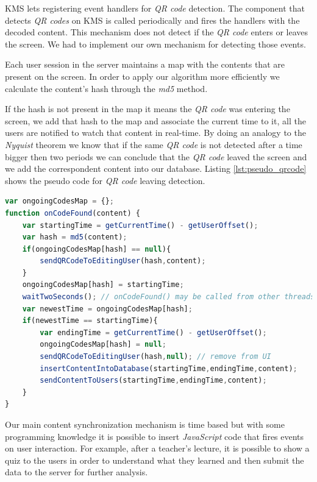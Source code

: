 	\ac{KMS} lets registering event handlers for \emph{QR code} detection. The component that detects \emph{QR codes} on \ac{KMS} is called periodically and fires the handlers with the decoded content. This mechanism does not detect if the \emph{QR code} enters or leaves the screen. We had to implement our own mechanism for detecting those events.

	Each user session in the server maintains a map with the contents that are present on the screen. In order to apply our algorithm more efficiently we calculate the content's hash through the \emph{md5} method.

	If the hash is not present in the map it means the \emph{QR code} was entering the screen, we add that hash to the map and associate the current time to it, all the users are notified to watch that content in real-time. By doing an analogy to the \emph{Nyquist} theorem we know that if the same \emph{QR code} is not detected after a time bigger then two periods we can conclude that the \emph{QR code} leaved the screen and we add the correspondent content into our database. Listing \ref{lst:pseudo_qrcode} shows the pseudo code for \emph{QR code} leaving detection.

\begin{minipage}[!htb]{\linewidth}
\begin{lstlisting}[caption={Pseudo code for QR code leaving detection},label={lst:pseudo_qrcode},language=JavaScript]
var ongoingCodesMap = {};
function onCodeFound(content) {
	var startingTime = getCurrentTime() - getUserOffset();
	var hash = md5(content);
	if(ongoingCodesMap[hash] == null){
		sendQRCodeToEditingUser(hash,content);
	}
	ongoingCodesMap[hash] = startingTime;
	waitTwoSeconds(); // onCodeFound() may be called from other threads
	var newestTime = ongoingCodesMap[hash]; 
	if(newestTime == startingTime){
		var endingTime = getCurrentTime() - getUserOffset();
		ongoingCodesMap[hash] = null; 
		sendQRCodeToEditingUser(hash,null); // remove from UI
		insertContentIntoDatabase(startingTime,endingTime,content);
		sendContentToUsers(startingTime,endingTime,content);
	}
}
\end{lstlisting}
\end{minipage}


	Our main content synchronization mechanism is time based but with some programming knowledge it is possible to insert \emph{JavaScript} code that fires events on user interaction. For example, after a teacher's lecture, it is possible to show a quiz to the users in order to understand what they learned and then submit the data to the server for further analysis.


